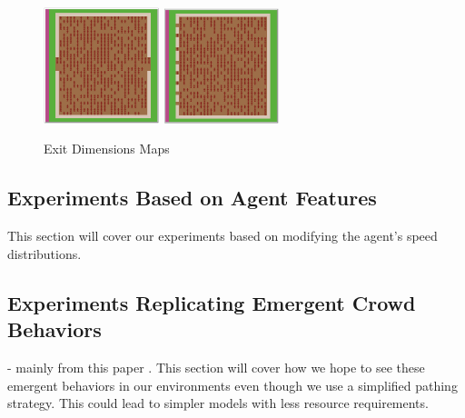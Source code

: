 \documentclass[12pt,letterpaper]{article}
\begin{document}
\begin{figure}[ht]
\begin{minipage}[b]{.75\linewidth}
    \includegraphics[width=0.3\textwidth]{./figures/exit_dims_8_b.png}
    \includegraphics[width=0.3\textwidth]{./figures/exit_dims_8_c.png}
  \end{minipage}
  \caption{Exit Dimensions Maps}
\end{figure}
\subsection{Experiments Based on Agent Features}

This section will cover our experiments based on modifying the agent's speed distributions.


\subsection{Experiments Replicating Emergent Crowd Behaviors} \label{emergentBehavior}
- mainly from this paper \cite{almeidaCrowdSimulationModeling2013}  .  This section will cover how we hope to see these emergent behaviors in our environments even though we use a simplified pathing strategy.  This could lead to simpler models with less resource requirements.
\end{document}
